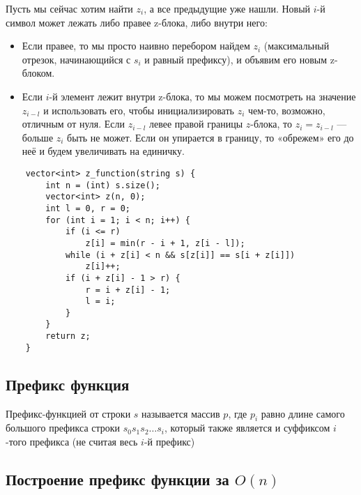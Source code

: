 \documentclass[a4paper]{article}
\begin{document}
Пусть мы сейчас хотим найти $z_i$, а все предыдущие уже нашли. Новый $i$-й символ может лежать либо правее z-блока, либо внутри него:
\begin{itemize}
    \item Если правее, то мы просто наивно перебором найдем $z_i$ (максимальный отрезок, начинающийся с $s_i$ и равный префиксу), и объявим его новым z-блоком.
    \item Если $i$-й элемент лежит внутри z-блока, то мы можем посмотреть на значение $z_{i-l}$ и использовать его, чтобы инициализировать $z_i$ чем-то, возможно, отличным от нуля. Если $z_{i-l}$ левее правой границы $z$-блока, то $z_i = z_{i-l}$ — больше $z_i$ быть не может. Если он упирается в границу, то «обрежем» его до неё и будем увеличивать на единичку.
\end{itemize}

\begin{lstlisting}
    vector<int> z_function(string s) {
        int n = (int) s.size();
        vector<int> z(n, 0);
        int l = 0, r = 0;
        for (int i = 1; i < n; i++) {
            if (i <= r)
                z[i] = min(r - i + 1, z[i - l]);
            while (i + z[i] < n && s[z[i]] == s[i + z[i]])
                z[i]++;
            if (i + z[i] - 1 > r) {
                r = i + z[i] - 1;
                l = i;
            }
        }
        return z;
    }
\end{lstlisting}


\subsection{Префикс функция}
Префикс-функцией от строки $s$ называется массив $p$, где $p_i$ равно длине самого большого префикса строки $s_0 s_1 s_2 \ldots s_i$, который также является и суффиксом $i$-того префикса (не считая весь $i$-й префикс)

\subsection{Построение префикс функции за $O(n)$}
\end{document}

